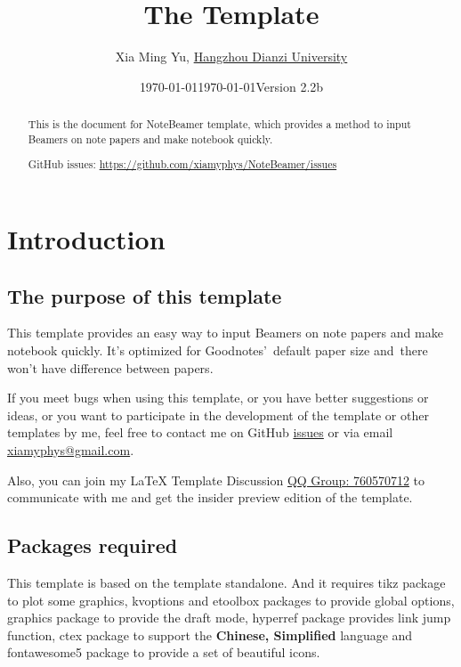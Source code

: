 \documentclass[11pt]{article}
\title{The \pkg{NoteBeamer} Template}
\author[1]{Xia Ming Yu, \href{https://www.hdu.edu.cn}{Hangzhou Dianzi University}}
\date{\today}
\affil[1]{\href{mailto:xiamyphys@gmail.com}{\texttt{xiamyphys@gmail.com}}}
\date{\today\quad Version 2.2b}
\makeatletter
\def\@pkg#1{\texorpdfstring{\href{https://www.ctan.org/pkg/#1}{\textcolor{pkgcolor}{\textsf{#1}}}}{“#1”}}
\def\s@pkg#1{\texorpdfstring{\textcolor{pkgcolor}{\textsf{#1}}}{“#1”}}
\DeclareRobustCommand\pkg{\@ifstar\s@pkg\@pkg}
\def\mode#1{\texorpdfstring{\textcolor{moducolor}{\textsf{#1}}}{“#1”}}
\makeatother
\begin{document}
\maketitle

\begin{abstract}
This is the document for \pkg{NoteBeamer} template, which provides a method to input Beamers on note papers and make notebook quickly.

GitHub issues: \url{https://github.com/xiamyphys/NoteBeamer/issues}

\end{abstract}

\tableofcontents

\section{Introduction}

\subsection{The purpose of this template}
This template provides an easy way to input Beamers on note papers and make notebook quickly. It's optimized for Goodnotes' default paper size and there won't have difference between papers.

If you meet bugs when using this template, or you have better suggestions or ideas, or you want to participate in the development of the template or other templates by me, feel free to contact me on GitHub \href{https://github.com/xiamyphys/NoteBeamer/issues}{issues} or via email \href{mailto:xiamyphys@gmail.com}{xiamyphys@gmail.com}.

Also, you can join my \textsf\LaTeX{} Template Discussion \href{https://qm.qq.com/q/OnHzbNvVAG}{QQ Group: 760570712} to communicate with me and get the insider preview edition of the template.

\subsection{Packages required}
This template is based on the template \pkg{standalone}. And it requires \pkg{tikz} package to plot some graphics, \pkg{kvoptions} and \pkg{etoolbox} packages to provide global options, \pkg{graphics} package to provide the \mode{draft} mode, \pkg{hyperref} package provides link jump function, \pkg{ctex} package to support the \textbf{Chinese, Simplified} language and \pkg{fontawesome5} package to provide a set of beautiful icons.
\end{document}

